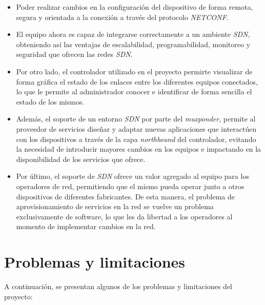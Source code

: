  \begin{itemize}

    \item Poder realizar cambios en la configuración del dispositivo de forma remota, segura y orientada a la conexión a través del protocolo \textit{NETCONF}. 
    \item El equipo ahora es capaz de integrarse correctamente a un ambiente \textit{SDN}, obteniendo así las ventajas de escalabilidad, programabilidad, monitoreo y seguridad que ofrecen las redes \textit{SDN}.
    \item Por otro lado, el controlador utilizado en el proyecto permirte visualizar de forma gráfica el estado de los enlaces entre los diferentes equipos conectados, lo que le permite al administrador conocer e identificar de forma sencilla el estado de los mismos.
    \item Además, el soporte de un entorno \textit{SDN} por parte del \textit{muxponder}, permite al proveedor de servicios diseñar y adaptar nuevas aplicaciones que interactúen con los dispositivos a través de la capa \textit{northbound} del controlador, evitando la necesidad de introducir mayores cambios en los equipos e impactando en la disponibilidad de los servicios que ofrece.
    \item Por último, el soporte de \textit{SDN} ofrece un valor agregado al equipo para los operadores de red, permitiendo que el mismo pueda operar junto a otros dispositivos de diferentes fabricantes. De esta manera, el problema de aprovisionamiento de servicios en la red se vuelve un problema exclusivamente de software, lo que les da libertad a los operadores al momento de implementar cambios en la red.

\end{itemize}


\section{Problemas y limitaciones} \label{problemasylimi}

A continuación, se presentan algunos de los problemas y limitaciones del proyecto:

